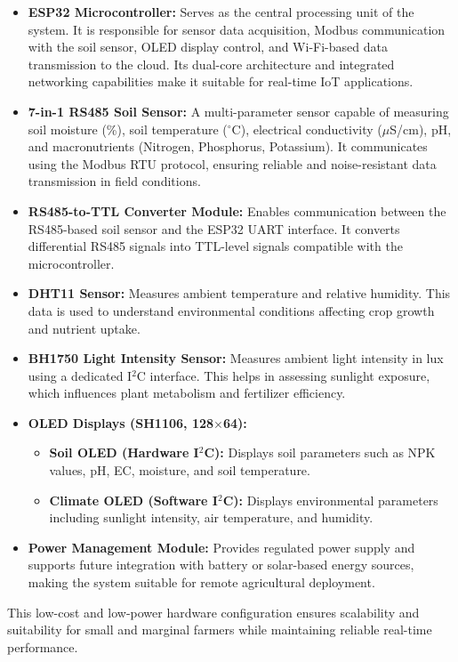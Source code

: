 \documentclass[conference]{IEEEtran}
\begin{document}
\begin{itemize}
\item \textbf{ESP32 Microcontroller:} Serves as the central processing unit of the system. It is responsible for sensor data acquisition, Modbus communication with the soil sensor, OLED display control, and Wi-Fi-based data transmission to the cloud. Its dual-core architecture and integrated networking capabilities make it suitable for real-time IoT applications.
\item \textbf{7-in-1 RS485 Soil Sensor:} A multi-parameter sensor capable of measuring soil moisture (\%), soil temperature ($^\circ$C), electrical conductivity ($\mu$S/cm), pH, and macronutrients (Nitrogen, Phosphorus, Potassium). It communicates using the Modbus RTU protocol, ensuring reliable and noise-resistant data transmission in field conditions.
\item \textbf{RS485-to-TTL Converter Module:} Enables communication between the RS485-based soil sensor and the ESP32 UART interface. It converts differential RS485 signals into TTL-level signals compatible with the microcontroller.
\item \textbf{DHT11 Sensor:} Measures ambient temperature and relative humidity. This data is used to understand environmental conditions affecting crop growth and nutrient uptake.
\item \textbf{BH1750 Light Intensity Sensor:} Measures ambient light intensity in lux using a dedicated I$^2$C interface. This helps in assessing sunlight exposure, which influences plant metabolism and fertilizer efficiency.
\item \textbf{OLED Displays (SH1106, 128$\times$64):}
\begin{itemize}
\item \textbf{Soil OLED (Hardware I$^2$C):} Displays soil parameters such as NPK values, pH, EC, moisture, and soil temperature.
\item \textbf{Climate OLED (Software I$^2$C):} Displays environmental parameters including sunlight intensity, air temperature, and humidity.
\end{itemize}
\item \textbf{Power Management Module:} Provides regulated power supply and supports future integration with battery or solar-based energy sources, making the system suitable for remote agricultural deployment.
\end{itemize}
This low-cost and low-power hardware configuration ensures scalability and suitability for small and marginal farmers while maintaining reliable real-time performance.
\end{document}
